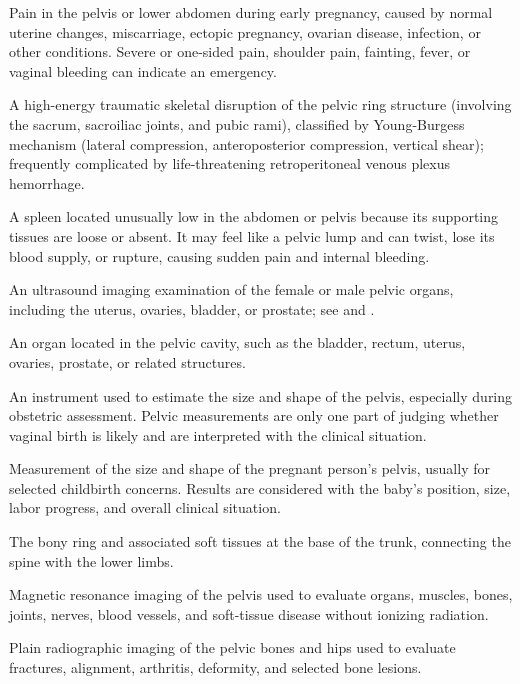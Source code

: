  Pain in the pelvis or lower abdomen during early pregnancy, caused by normal uterine changes, miscarriage, ectopic pregnancy, ovarian disease, infection, or other conditions. Severe or one-sided pain, shoulder pain, fainting, fever, or vaginal bleeding can indicate an emergency.

 A high-energy traumatic skeletal disruption of the pelvic ring structure (involving the sacrum, sacroiliac joints, and pubic rami), classified by Young-Burgess mechanism (lateral compression, anteroposterior compression, vertical shear); frequently complicated by life-threatening retroperitoneal venous plexus hemorrhage.

 A spleen located unusually low in the abdomen or pelvis because its supporting tissues are loose or absent. It may feel like a pelvic lump and can twist, lose its blood supply, or rupture, causing sudden pain and internal bleeding.

 An ultrasound imaging examination of the female or male pelvic organs, including the uterus, ovaries, bladder, or prostate; see  and .

 An organ located in the pelvic cavity, such as the bladder, rectum, uterus, ovaries, prostate, or related structures.

 An instrument used to estimate the size and shape of the pelvis, especially during obstetric assessment. Pelvic measurements are only one part of judging whether vaginal birth is likely and are interpreted with the clinical situation.

 Measurement of the size and shape of the pregnant person's pelvis, usually for selected childbirth concerns. Results are considered with the baby's position, size, labor progress, and overall clinical situation.

 The bony ring and associated soft tissues at the base of the trunk, connecting the spine with the lower limbs.

 Magnetic resonance imaging of the pelvis used to evaluate organs, muscles, bones, joints, nerves, blood vessels, and soft-tissue disease without ionizing radiation.

 Plain radiographic imaging of the pelvic bones and hips used to evaluate fractures, alignment, arthritis, deformity, and selected bone lesions.

